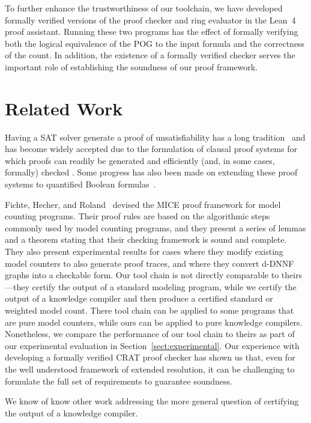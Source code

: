 \documentclass[letterpaper,USenglish,cleveref, autoref, thm-restate]{lipics-v2021}
\newcommand{\lean}{Lean~4}
\begin{document}
To further enhance the trustworthiness of our toolchain, we have
developed formally verified versions of the proof checker and ring
evaluator in the \lean{} proof assistant.  Running these two programs
has the effect of formally verifying both the logical equivalence of the POG to the input formula and the correctness of the count.
In addition, the
existence of a formally verified checker serves the important role of
establishing the soundness of our proof framework.

\section{Related Work}

Having a SAT solver generate a proof of unsatisfiability has a long
tradition~\cite{ZhangMalik} and has become widely accepted due to the
formulation of clausal proof systems for which proofs can readily be
generated and efficiently (and, in some cases, formally) checked
\cite{cruz-cade-2017,RAT,wetzler14_drattrim,Tan:2021}.  Some progress has also
been made on extending these proof systems to quantified Boolean
formulas~\cite{bryant:cade:2021,heule:JAR2014}.

Fichte, Hecher, and Roland~\cite{fichte:sat:2022} devised the MICE
proof framework for model counting programs.  Their proof rules are
based on the algorithmic steps commonly used by model counting
programs, and they present a series of lemmas and a theorem stating
that their checking framework is sound and complete.  They also
present experimental results for cases where they modify existing
model counters to also generate proof traces, and where they convert
d-DNNF graphs into a checkable form.  Our tool chain is not directly
comparable to theirs---they certify the output of a standard modeling
program, while we certify the output of a knowledge compiler and then
produce a certified standard or weighted model count.  There tool
chain can be applied to some programs that are pure model counters,
while ours can be applied to pure knowledge compilers.  Nonetheless,
we compare the performance of our tool chain to theirs as part of our
experimental evaluation in Section~\ref{sect:experimental}.  Our
experience with developing a formally verified CRAT proof checker has shown
us that, even for the well understood framework of extended
resolution, it can be challenging to formulate the full set of requirements to guarantee soundness.

We know of know other work addressing the more general question of
certifying the output of a knowledge compiler.
\end{document}
